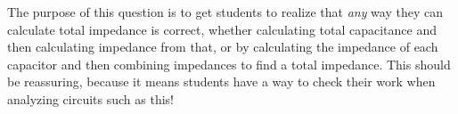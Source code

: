 The purpose of this question is to get students to realize that {\it any} way they can calculate total impedance is correct, whether calculating total capacitance and then calculating impedance from that, or by calculating the impedance of each capacitor and then combining impedances to find a total impedance.  This should be reassuring, because it means students have a way to check their work when analyzing circuits such as this!




